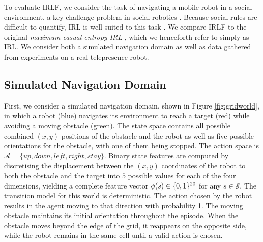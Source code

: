 \documentclass{aamas2016}
\begin{document}
To evaluate IRLF, we consider the task of navigating a mobile robot in a social environment, a key challenge problem in social robotics \cite{pacchierotti2006embodied}. Because social rules are difficult to quantify, IRL is well suited to this task \cite{henry2010learning,vasquez2014inverse}.  We compare IRLF to the original \emph{maximum casual entropy IRL} \cite{ziebart2008maximum}, which we henceforth refer to simply as IRL.  We  consider both a simulated navigation domain as well as data gathered from experiments on a real telepresence robot.

\subsection{Simulated Navigation Domain \label{sec:sim_nav}}

First, we consider a simulated navigation domain, shown in Figure \ref{fig:gridworld}, in which a robot (blue) navigates its environment to reach a target (red) while avoiding a moving
obstacle (green). The state space contains all possible combined $(x,y)$ positions of the obstacle and the robot as well as five possible orientations for the obstacle, with one of them being stopped. The action space is $\mathcal{A} = \{up,down,left,right,stay\}$. Binary state features are computed by discretising the displacement between the $(x,y)$ coordinates of the robot to both the obstacle and the target into $5$ possible values for each of the four dimensions, yielding a complete feature vector $\phi(s)\in\mathbb \{0,1\}^{20}$ for any $s\in\mathcal{S}$. The transition model for this world is deterministic. The action chosen by the robot results in the agent moving to that direction with probability 1. The moving obstacle maintains its initial orientation throughout the episode. When the obstacle moves beyond the edge of the grid, it reappears on the opposite side, while the robot remains in the same cell until a valid action is chosen.
\end{document}
